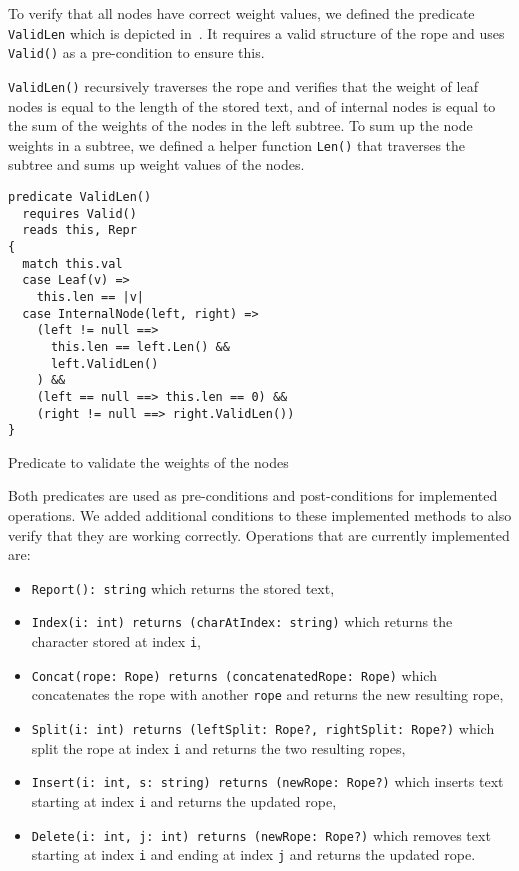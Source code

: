 To verify that all nodes have correct weight values, we defined the predicate \texttt{ValidLen} which is depicted in~.
It requires a valid structure of the rope and uses \texttt{Valid()} as a pre-condition to ensure this.

\texttt{ValidLen()} recursively traverses the rope and verifies that the weight of leaf nodes is equal to the length of the stored text, and of internal nodes is equal to the sum of the weights of the nodes in the left subtree.
To sum up the node weights in a subtree, we defined a helper function \texttt{Len()} that traverses the subtree and sums up weight values of the nodes.

\begin{listing}[h!]
\begin{verbatim}
predicate ValidLen()
  requires Valid()
  reads this, Repr
{
  match this.val
  case Leaf(v) => 
    this.len == |v|
  case InternalNode(left, right) =>
    (left != null ==> 
      this.len == left.Len() && 
      left.ValidLen()
    ) &&
    (left == null ==> this.len == 0) &&
    (right != null ==> right.ValidLen())
}
\end{verbatim}
    \caption{Predicate to validate the weights of the nodes}
    \label{lst:rope-valid-len}
\end{listing}

Both predicates are used as pre-conditions and post-conditions for implemented operations. 
We added additional conditions to these implemented methods to also verify that they are working correctly.
Operations that are currently implemented are: 
\begin{itemize}
  \item \texttt{Report(): string} which returns the stored text,
  \item \texttt{Index(i: int) returns (charAtIndex: string)} which returns the character stored at index \texttt{i},
  \item \texttt{Concat(rope: Rope) returns (concatenatedRope: Rope)} which concatenates the rope with another \texttt{rope} and returns the new resulting rope,
  \item \texttt{Split(i: int) returns (leftSplit: Rope?, rightSplit: Rope?)} which split the rope at index \texttt{i} and returns the two resulting ropes,
  \item \texttt{Insert(i: int, s: string) returns (newRope: Rope?)} which inserts text starting at index \texttt{i} and returns the updated rope,
  \item \texttt{Delete(i: int, j: int) returns (newRope: Rope?)} which removes text starting at index \texttt{i} and ending at index \texttt{j} and returns the updated rope.
\end{itemize}


